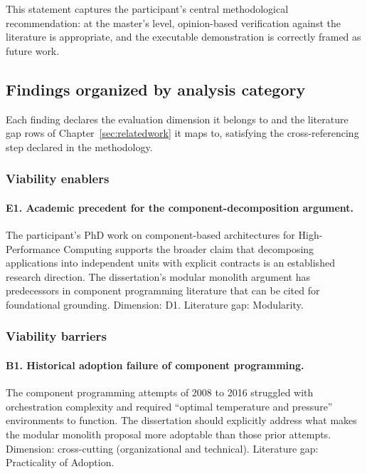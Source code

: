 This statement captures the participant's central methodological recommendation: at the master's level, opinion-based verification against the literature is appropriate, and the executable demonstration is correctly framed as future work.

\subsection*{Findings organized by analysis category}

Each finding declares the evaluation dimension it belongs to and the literature gap rows of Chapter~\ref{sec:relatedwork} it maps to, satisfying the cross-referencing step declared in the methodology.

\subsubsection*{Viability enablers}

\paragraph*{E1. Academic precedent for the component-decomposition argument.} The participant's PhD work on component-based architectures for High-Performance Computing supports the broader claim that decomposing applications into independent units with explicit contracts is an established research direction. The dissertation's modular monolith argument has predecessors in component programming literature that can be cited for foundational grounding. Dimension: D1. Literature gap: Modularity.

\subsubsection*{Viability barriers}

\paragraph*{B1. Historical adoption failure of component programming.} The component programming attempts of 2008 to 2016 struggled with orchestration complexity and required ``optimal temperature and pressure'' environments to function. The dissertation should explicitly address what makes the modular monolith proposal more adoptable than those prior attempts. Dimension: cross-cutting (organizational and technical). Literature gap: Practicality of Adoption.

